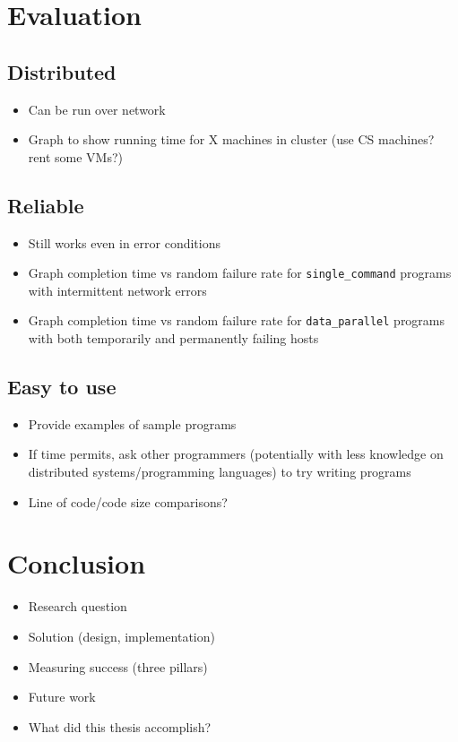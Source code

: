 \documentclass[twoside]{report}
\begin{document}
\chapter{Evaluation}

\section{Distributed}
\begin{itemize}
  \item Can be run over network
  \item Graph to show running time for X machines in cluster (use CS machines? rent some VMs?)
\end{itemize}

\section{Reliable}

\begin{itemize}
  \item Still works even in error conditions
  \item Graph completion time vs random failure rate for \texttt{single\_command} programs with intermittent network errors
  \item Graph completion time vs random failure rate for \texttt{data\_parallel} programs with both temporarily and permanently failing hosts
\end{itemize}

\section{Easy to use}

\begin{itemize}
  \item Provide examples of sample programs
  \item If time permits, ask other programmers (potentially with less knowledge on distributed systems/programming languages) to try writing programs
  \item Line of code/code size comparisons?
\end{itemize}

\chapter{Conclusion}
\begin{itemize}
  \item Research question
  \item Solution (design, implementation)
  \item Measuring success (three pillars)
  \item Future work
  \item What did this thesis accomplish?
\end{itemize}



\end{document}
